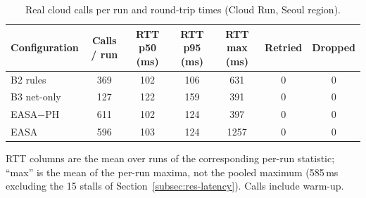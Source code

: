 \begin{table}[H]
\caption{Real cloud calls per run and round-trip times (Cloud Run, Seoul region).}
\label{tab:rtt}
\centering\footnotesize
\begin{tabular}{lcccccc}
\toprule
Configuration & Calls / run & RTT p50 (ms) & RTT p95 (ms) & RTT max (ms) & Retried & Dropped \\
\midrule
B2 rules & 369 & 102 & 106 & 631 & 0 & 0 \\
B3 net-only & 127 & 122 & 159 & 391 & 0 & 0 \\
EASA$-$PH & 611 & 102 & 124 & 397 & 0 & 0 \\
EASA & 596 & 103 & 124 & 1257 & 0 & 0 \\
\bottomrule
\end{tabular}
\par\vspace{2pt}\begin{minipage}{\linewidth}\scriptsize\raggedright RTT columns are the mean over runs of the corresponding per-run statistic; ``max'' is the mean of the per-run maxima, not the pooled maximum (585\,ms excluding the 15 stalls of Section~\ref{subsec:res-latency}). Calls include warm-up.\end{minipage}
\end{table}
